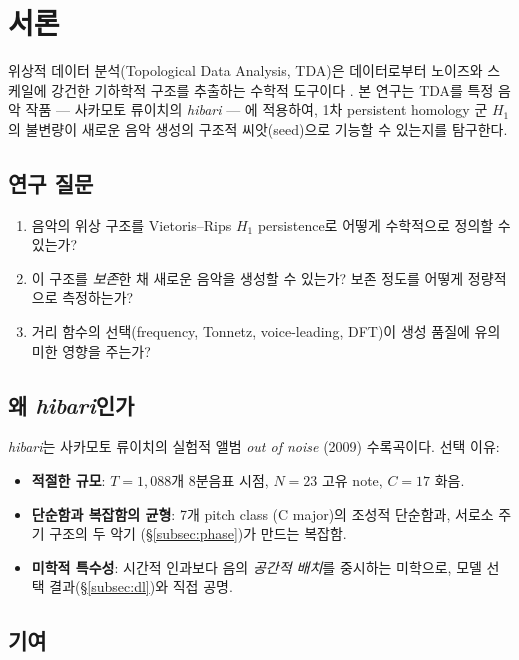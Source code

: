 \documentclass[11pt,a4paper]{article}
\begin{document}
\section{서론}
\label{sec:intro}

위상적 데이터 분석(Topological Data Analysis, TDA)은 데이터로부터
노이즈와 스케일에 강건한 기하학적 구조를 추출하는 수학적 도구이다
\cite{carlsson2009,edelsbrunner2010}.
본 연구는 TDA를 특정 음악 작품 --- 사카모토 류이치의 \emph{hibari}
--- 에 적용하여, 1차 persistent homology 군 $H_1$의 불변량이
새로운 음악 생성의 구조적 씨앗(seed)으로 기능할 수 있는지를 탐구한다.

\subsection{연구 질문}

\begin{enumerate}
\item 음악의 위상 구조를 Vietoris--Rips $H_1$ persistence로
      어떻게 수학적으로 정의할 수 있는가?
\item 이 구조를 \emph{보존}한 채 새로운 음악을 생성할 수 있는가?
      보존 정도를 어떻게 정량적으로 측정하는가?
\item 거리 함수의 선택(frequency, Tonnetz, voice-leading, DFT)이
      생성 품질에 유의미한 영향을 주는가?
\end{enumerate}

\subsection{왜 \emph{hibari}인가}

\emph{hibari}는 사카모토 류이치의 실험적 앨범
\emph{out of noise} (2009) 수록곡이다. 선택 이유:

\begin{itemize}
\item \textbf{적절한 규모}: $T = 1{,}088$개 8분음표 시점, $N = 23$ 고유 note,
      $C = 17$ 화음.
\item \textbf{단순함과 복잡함의 균형}: 7개 pitch class (C major)의 조성적
      단순함과, 서로소 주기 구조의 두 악기 (\S\ref{subsec:phase})가 만드는 복잡함.
\item \textbf{미학적 특수성}: 시간적 인과보다 음의 \emph{공간적 배치}를
      중시하는 미학으로, 모델 선택 결과(\S\ref{subsec:dl})와 직접 공명.
\end{itemize}

\subsection{기여}
\end{document}
